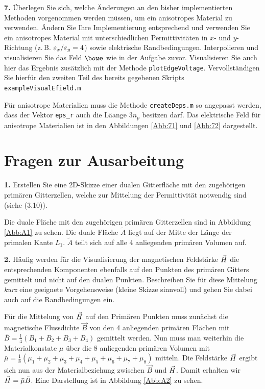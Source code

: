 \documentclass[Protokollheft.tex]{subfiles}
\begin{document}
\begin{framed}
	\noindent \textbf{7.} Überlegen Sie sich, welche Änderungen an den bisher implementierten Methoden 
vorgenommen werden müssen, um ein anisotropes Material zu verwenden. Ändern Sie 
Ihre Implementierung entsprechend und verwenden Sie ein anisotropes Material mit unterschiedlichen
Permittivitäten in $x$- und $y$-Richtung (z.\,B.
$\varepsilon_x / \varepsilon_y=4$) sowie elektrische
Randbedingungen. Interpolieren und visualisieren Sie das Feld
$\efit$ wie in der Aufgabe zuvor. Visualisieren Sie auch hier das Ergebnis zusätzlich mit der Methode \lstinline{plotEdgeVoltage}. Vervollständigen Sie hierfür den zweiten Teil des bereits gegebenen Skripts \lstinline{exampleVisualEfield.m}\label{exer:exampleVisualEfield2}\\
\end{framed}
\noindent
Für anisotrope Materialien muss die Methode \lstinline{createDeps.m} so angepasst werden, dass der Vektor \lstinline{eps_r} auch die Läange $3n_p$ besitzen darf. Das elektrische Feld für anisotrope Materialien ist in den Abbildungen \ref{Abb:71} und \ref{Abb:72} dargestellt.

\section{Fragen zur Ausarbeitung}

	\begin{framed}
	\noindent \textbf{1.} Erstellen Sie eine 2D-Skizze einer dualen
	Gitterfläche mit den zugehörigen primären Gitterzellen, welche
    zur Mittelung der Permittivität notwendig sind (siehe (3.10)).\label{exer:averagingEps}
\end{framed}
\noindent
Die duale Fläche mit den zugehörigen primären Gitterzellen sind in Abbildung \ref{Abb:A1} zu sehen. Die duale Fläche $\tilde{A}$ liegt auf der Mitte der Länge der primalen Kante $L_1$. $\tilde{A}$ teilt sich auf alle 4 anliegenden primären Volumen auf.


	\begin{framed}
	\noindent \textbf{2.} Häufig werden für die Visualisierung der magnetischen Feldstärke
	$ \vec{H} $ die entsprechenden Komponenten ebenfalls auf den Punkten des
	primären Gitters gemittelt und nicht auf den dualen
	Punkten. Beschreiben Sie für diese Mittelung \emph{kurz} eine geeignete Vorgehensweise (kleine Skizze sinnvoll)
	und gehen Sie dabei auch auf die Randbedingungen ein.\label{exer:averageHfield}
\end{framed}
\noindent
Für die Mittelung von $ \vec{H} $ auf den Primären Punkten muss zunächst die magnetische Flussdichte $\vec{B}$ von den 4 anliegenden primären Flächen mit $\bar{B}=\frac{1}{4}(B_1+B_2+B_3+B_4)$ gemittelt werden. Nun muss man weiterhin die Materialkonstate $\mu$ über die 8 anliegenden primären Volumen mit $\bar{\mu}=\frac{1}{8}(\mu_1+\mu_2+\mu_3+\mu_4+\mu_5+\mu_6+\mu_7+\mu_8)$ mitteln. Die Feldstärke $ \vec{H} $ ergibt sich nun aus der Materialbeziehung zwischen $\vec{B}$ und $ \vec{H} $. Damit erhalten wir $ \vec{H} =\bar{\mu}\bar{B}$. Eine Darstellung ist in Abbildung \ref{Abb:A2} zu sehen.
\end{document}
